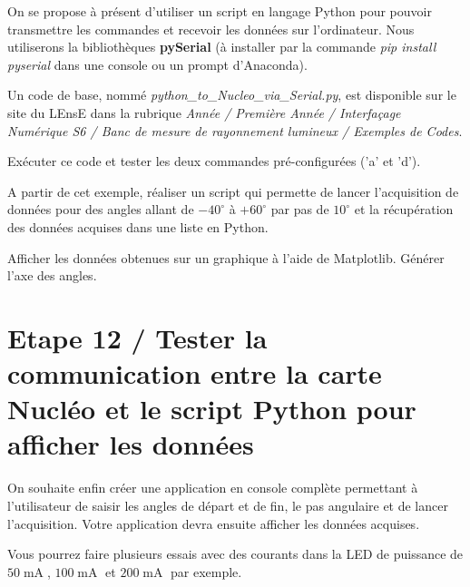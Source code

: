 \documentclass[a4paper,11pt,titlepage]{article} %
\begin{document}
\medskip

On se propose à présent d'utiliser un script en langage Python pour pouvoir transmettre les commandes et recevoir les données sur l'ordinateur. Nous utiliserons la bibliothèques \textbf{pySerial} (à installer par la commande \textsl{pip install pyserial} dans une console ou un prompt d'Anaconda).

\medskip

Un code de base, nommé \textsl{python\_to\_Nucleo\_via\_Serial.py}, est disponible sur le site du LEnsE dans la rubrique \textit{Année / Première Année / Interfaçage Numérique S6 / Banc de mesure de rayonnement lumineux / Exemples de Codes}.

\medskip

\Manip Exécuter ce code et tester les deux commandes pré-configurées ('a' et 'd').

\Manip A partir de cet exemple, réaliser un script qui permette de lancer l'acquisition de données pour des angles allant de $-40^\circ{}$ à $+60^\circ{}$ par pas de $10^\circ{}$ et la récupération des données acquises dans une liste en Python.

\Manip Afficher les données obtenues sur un graphique à l'aide de Matplotlib. Générer l'axe des angles.


\section{Etape 12 / Tester la communication entre la carte Nucléo et le script Python pour afficher les données}

On souhaite enfin créer une application en console complète permettant à l'utilisateur de saisir les angles de départ et de fin, le pas angulaire et de lancer l'acquisition. Votre application devra ensuite afficher les données acquises.

Vous pourrez faire plusieurs essais avec des courants dans la LED de puissance de $50\operatorname{mA}$, $100\operatorname{mA}$ et $200\operatorname{mA}$ par exemple.


\newpage
\end{document}
